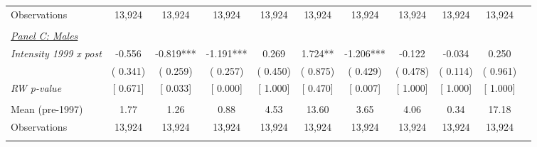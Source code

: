 \begin{tabular}{lcccccccccc}
Observations &       13,924 &       13,924 &       13,924 &       13,924 &       13,924 &       13,924 &       13,924 &       13,924 &       13,924 \\ 
  & & & & & & & & & \\ 
\underline{\textit{Panel C: Males}}  \\ 
\textit{Intensity 1999 x post} &       -0.556 &       -0.819*** &       -1.191*** &        0.269 &        1.724** &       -1.206*** &       -0.122 &       -0.034 &        0.250 \\ 
 & (       0.341) & (       0.259) & (       0.257) & (       0.450) & (       0.875) & (       0.429) & (       0.478) & (       0.114) & (       0.961) \\ 
\textit{RW p-value} & [ 0.671] & [ 0.033] & [ 0.000] & [ 1.000] & [ 0.470] & [ 0.007] & [ 1.000] & [ 1.000] & [ 1.000] \\ 
  & & & & & & & & & \\ 
Mean (pre-1997) &         1.77 &         1.26 &         0.88 &         4.53 &        13.60 &         3.65 &         4.06 &         0.34 &        17.18 \\ 
Observations &       13,924 &       13,924 &       13,924 &       13,924 &       13,924 &       13,924 &       13,924 &       13,924 &       13,924 \\ 
  & & & & & & & & & \\ 
\bottomrule
\end{tabular}